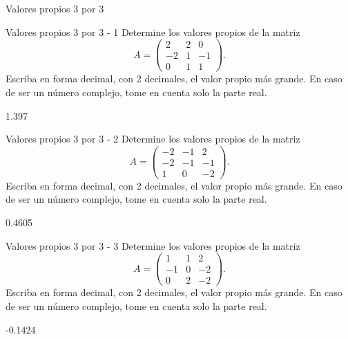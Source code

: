 \documentclass[a4,11pt]{aleph-notas}
\begin{document}
\begin{quiz}{Valores propios 3 por 3}

\begin{numerical}[tolerance=0.01]%
    {Valores propios 3 por 3 - 1}
    Determine los valores propios de la matriz
    \[
    A = \begin{pmatrix}
    2 & 2 & 0 \\
    -2 & 1 & -1 \\
    0 & 1 & 1
    \end{pmatrix}.
    \]
    Escriba en forma decimal, con 2 decimales, el valor propio más grande. En caso de ser un número complejo, tome en cuenta solo la parte real.
    \item[] 1.397
\end{numerical}

\begin{numerical}[tolerance=0.01]%
    {Valores propios 3 por 3 - 2}
    Determine los valores propios de la matriz
    \[
    A = \begin{pmatrix}
    -2 & -1 & 2 \\
    -2 & -1 & -1 \\
    1 & 0 & -2
    \end{pmatrix}.
    \]
    Escriba en forma decimal, con 2 decimales, el valor propio más grande. En caso de ser un número complejo, tome en cuenta solo la parte real.
    \item[] 0.4605
\end{numerical}

\begin{numerical}[tolerance=0.01]%
    {Valores propios 3 por 3 - 3}
    Determine los valores propios de la matriz
    \[
    A = \begin{pmatrix}
    1 & 1 & 2 \\
    -1 & 0 & -2 \\
    0 & 2 & -2
    \end{pmatrix}.
    \]
    Escriba en forma decimal, con 2 decimales, el valor propio más grande. En caso de ser un número complejo, tome en cuenta solo la parte real.
    \item[] -0.1424
\end{numerical}


\end{quiz}
\end{document}
